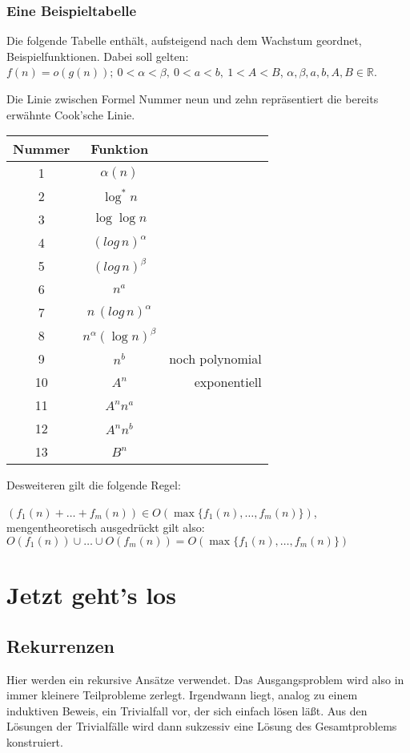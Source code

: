 \documentclass[ngerman]{scrreprt}%
\theoremstyle{break}
\begin{document}
\subsection{Eine Beispieltabelle}
Die folgende Tabelle enthält, aufsteigend nach dem Wachstum geordnet, Beispielfunktionen.
Dabei soll gelten: $f(n)=o(g(n));\ 0 < \alpha < \beta,\ 0<a<b,\ 1<A<B$,
$\alpha,\beta,a, b, A, B \in \mathbb{R}$.

Die Linie zwischen Formel Nummer neun und zehn repräsentiert die bereits erwähnte Cook'sche Linie.
\bigskip

\begin{table}[h]
\begin{tabular}{c|cr}
    Nummer      &Funktion       \\ \hline
    1   &       $\alpha (n)$    \\
    2   &       $\log^{*}n$     \\
    3   &       $\log \log n $  \\
    4   &       ${(log\,n)}^{\alpha}$ \\
    5   &       ${(log\,n)}^{\beta}$  \\
    6   &       $n^a$           \\
    7   &       $n\,(log\,n)^{\alpha}$      \\
    8   &       $n^{\alpha}{(\log n)}^{\beta}$  \\
    9   &       $n^b$           & noch polynomial\\ \hline
    10  &       $A^n$           & exponentiell\\
    11  &       $A^n n^a$       \\
    12  &       $A^n n^b$       \\
    13  &       $B^n$           
\end{tabular}
\end{table}

Desweiteren gilt die folgende Regel:

\noindent
$(f_1(n)+ \dots +f_m(n)) \in O (\max\{f_1(n),\dots,f_m(n)\})$, mengentheoretisch ausgedrückt gilt also: $O(f_1(n)) \cup \dots
\cup O(f_m(n)) = O (\max\{f_1(n),\dots,f_m(n)\})$


\chapter{Jetzt geht's los}

\section{Rekurrenzen}
Hier werden ein rekursive Ansätze verwendet. Das Ausgangsproblem wird also in immer kleinere Teilprobleme zerlegt.
Irgendwann liegt, analog zu einem induktiven Beweis, ein Trivialfall vor, der sich einfach lösen läßt. Aus den Lösungen der Trivialfälle
wird dann sukzessiv eine Lösung des Gesamtproblems konstruiert.
\end{document}
